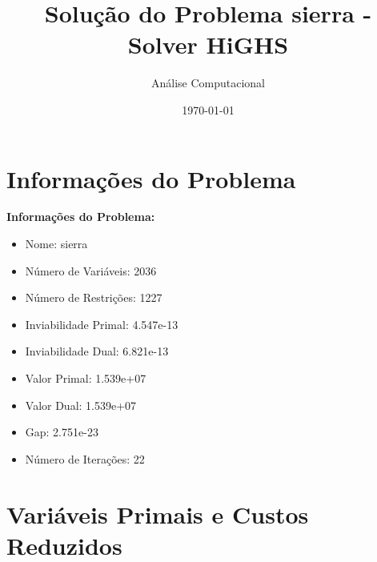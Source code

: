 \documentclass[12pt]{article}
\title{Solução do Problema sierra - Solver HiGHS}
\author{Análise Computacional}
\date{\today}
\begin{document}
\maketitle

\section{Informações do Problema}

\textbf{Informações do Problema:}
\begin{itemize}
\item Nome: sierra
\item Número de Variáveis: 2036
\item Número de Restrições: 1227
\item Inviabilidade Primal: 4.547e-13
\item Inviabilidade Dual: 6.821e-13
\item Valor Primal: 1.539e+07
\item Valor Dual: 1.539e+07
\item Gap: 2.751e-23
\item Número de Iterações: 22
\end{itemize}


\section{Variáveis Primais e Custos Reduzidos}
\end{document}
